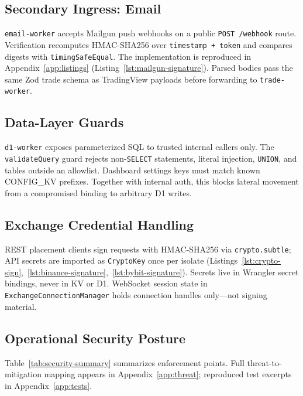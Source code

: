 \subsection{Secondary Ingress: Email}

\texttt{email-worker} accepts Mailgun push webhooks on a public \texttt{POST /webhook} route. Verification recomputes HMAC-SHA256 over \texttt{timestamp + token} and compares digests with \texttt{timingSafeEqual}. The implementation is reproduced in Appendix~\ref{app:listings} (Listing~\ref{lst:mailgun-signature}). Parsed bodies pass the same Zod trade schema as TradingView payloads before forwarding to \texttt{trade-worker}.

\subsection{Data-Layer Guards}

\texttt{d1-worker} exposes parameterized SQL to trusted internal callers only. The \texttt{validateQuery} guard rejects non-\texttt{SELECT} statements, literal injection, \texttt{UNION}, and tables outside an allowlist. Dashboard settings keys must match known CONFIG\_KV prefixes. Together with internal auth, this blocks lateral movement from a compromised binding to arbitrary D1 writes.

\subsection{Exchange Credential Handling}

REST placement clients sign requests with HMAC-SHA256 via \texttt{crypto.subtle}; API secrets are imported as \texttt{CryptoKey} once per isolate (Listings~\ref{lst:crypto-sign},~\ref{lst:binance-signature},~\ref{lst:bybit-signature}). Secrets live in Wrangler secret bindings, never in KV or D1. WebSocket session state in \texttt{ExchangeConnectionManager} holds connection handles only---not signing material.


\subsection{Operational Security Posture}

Table~\ref{tab:security-summary} summarizes enforcement points. Full threat-to-mitigation mapping appears in Appendix~\ref{app:threat}; reproduced test excerpts in Appendix~\ref{app:tests}.

